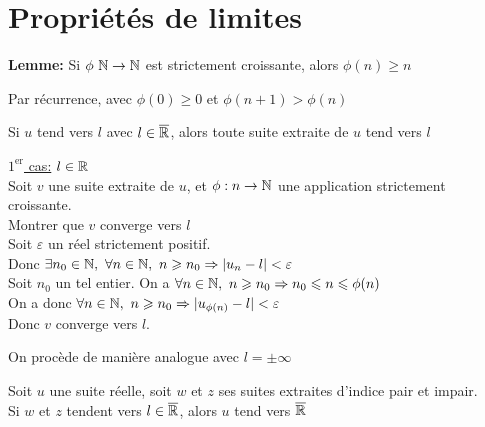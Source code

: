 \documentclass[12pt,twoside,a4paper]{article}
\begin{document}
	\section{Propri\'et\'es de limites}
		\begin{prop}
			\textbf{Lemme:} Si $\phi\ \N\rightarrow\N$ est strictement croissante, alors $\phi(n)\geqslant n$
		\end{prop}
		\begin{preuve}
			Par r\'ecurrence, avec $\phi(0)\geqslant 0$ et $\phi(n+1)>\phi(n)$
		\end{preuve}
		\begin{prop}
			Si $u$ tend vers $l$ avec $l\in\overline{\mathbb{R}}$, alors toute suite extraite de $u$ tend vers $l$
		\end{prop}
		\begin{preuve}
			\begin{liste}
				\item[\cercle1] \underline{$1^{\text{er}}$ cas:} $l\in\mathbb{R}$\\
					Soit $v$ une suite extraite de $u$, et $\phi : n\rightarrow\mathbb{N}$ une application strictement croissante.\\
					Montrer que $v$ converge vers $l$\\
					Soit $\varepsilon$ un r\'eel strictement positif.\\
					Donc $\exists n_0\in\N,\ \forall n\in\N,\ n\geqslant n_0\Rightarrow |u_n-l|<\varepsilon$\\
					Soit $n_0$ un tel entier. On a $\forall n\in\N,\ n\geqslant n_0\Rightarrow n_0\leqslant n\leqslant\phi(n)$\\
					On a donc $\forall n\in\mathbb{N},\ n\geqslant n_0\Rightarrow |u_{\phi(n)}-l|<\varepsilon$\\
					Donc $v$ converge vers $l$.
				\item[\cercle2]On proc\`ede de mani\`ere analogue avec $l=\pm\infty$
			\end{liste}
		\end{preuve}
		\begin{prop}
			Soit $u$ une suite r\'eelle, soit $w$ et $z$ ses suites extraites d'indice pair et impair.\\
			Si $w$ et $z$ tendent vers $l\in\overline{\mathbb{R}}$, alors $u$ tend vers $\overline{\mathbb{R}}$
		\end{prop}
\end{document}
